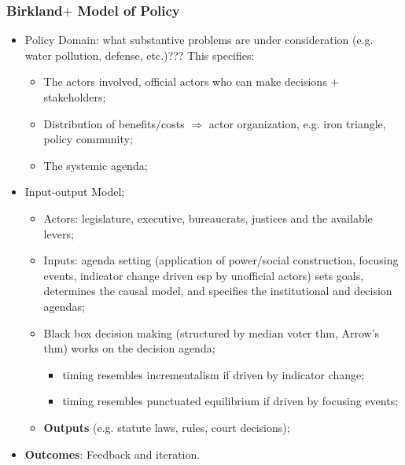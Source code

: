 \documentclass[aspectratio=169]{beamer}
\theoremstyle{principle}
\begin{document}
\begin{frame}
\frametitle{Birkland$+$ Model of Policy}
\begin{itemize}
\item Policy Domain: what substantive problems are under consideration (e.g. water pollution, defense, etc.)???  This specifies:
\begin{itemize}
\item The actors involved, official actors who can make decisions $+$ stakeholders; 
\item Distribution of benefits/costs $\Rightarrow$ actor organization, e.g. iron triangle, policy community;
\item The systemic agenda; 
\end{itemize}
\bigskip
\item \color{black}Input-output Model;
\begin{itemize}
\item Actors: legislature, executive, bureaucrats, justices and the available levers;
\item Inputs: agenda setting (application of power/social construction, focusing events, indicator change driven esp by unofficial actors) sets goals, determines the causal model, and specifies the institutional and decision agendas;
\item Black box decision making (structured by median voter thm, Arrow's thm) works on the decision agenda;
\begin{itemize}
\item timing resembles incrementalism if driven by indicator change;
\item timing resembles punctuated equilibrium if driven by focusing events;
 \end{itemize}
\item \textbf{Outputs} (e.g. statute laws, rules, court decisions);
\end{itemize}
\bigskip
\item \textbf{Outcomes}: Feedback and iteration.
\end{itemize}
\end{frame}
\end{document}
